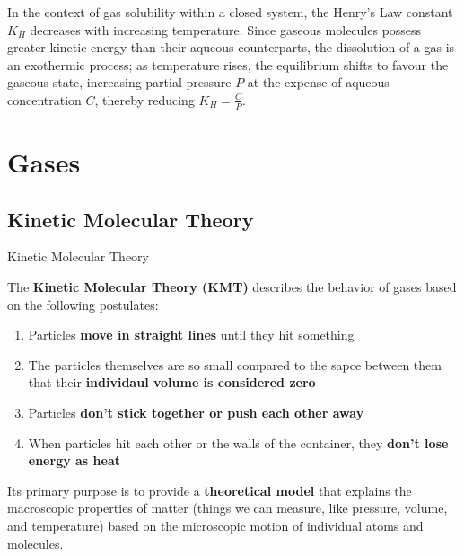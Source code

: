 \documentclass[10pt]{article}
\begin{document}
    In the context of gas solubility within a closed system, the Henry's Law constant $K_{H}$ decreases with increasing temperature. Since gaseous molecules possess greater kinetic energy than their aqueous counterparts, the dissolution of a gas is an exothermic process; as temperature rises, the equilibrium shifts to favour the gaseous state, increasing partial pressure $P$ at the expense of aqueous concentration $C$, thereby reducing $K_{H} = \frac{C}{P}$.
    

\section{Gases}

  \subsection{Kinetic Molecular Theory}

    \begin{core}{Kinetic Molecular Theory}

      The \textbf{Kinetic Molecular Theory (KMT)} describes the behavior of gases based on the following postulates:

      \begin{enumerate}

        \item Particles \textbf{move in straight lines} until they hit something

        \item The particles themselves are so small compared to the sapce between them that their \textbf{individaul volume is considered zero}

        \item Particles \textbf{don't stick together or push each other away}

        \item When particles hit each other or the walls of the container, they \textbf{don't lose energy as heat}
            
      \end{enumerate}

      Its primary purpose is to provide a \textbf{theoretical model} that explains the macroscopic properties of matter (things we can measure, like pressure, volume, and temperature) based on the microscopic motion of individual atoms and molecules.

    \end{core}
   
\end{document}
